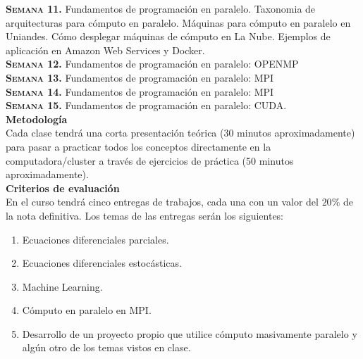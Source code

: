 \documentclass[letterpaper,10pt,onecolumn]{article}
\begin{document}
\noindent\textbf{\textsc{Semana 11.}}  
Fundamentos de programaci\'on en paralelo. Taxonomia de arquitecturas
para c\'omputo en paralelo. M\'aquinas para c\'omputo en paralelo en
Uniandes. 
C\'omo desplegar m\'aquinas de c\'omputo en La Nube. Ejemplos de
aplicaci\'on en Amazon Web Services y Docker. 
\\[-0.3cm]  

\noindent\textbf{\textsc{Semana 12.}} 
Fundamentos de programaci\'on en paralelo: OPENMP
\\[-0.3cm]  

\noindent\textbf{\textsc{Semana 13.}} 
Fundamentos de programaci\'on en paralelo: MPI
\\[-0.3cm] 

\noindent\textbf{\textsc{Semana 14.}} 
Fundamentos de programaci\'on en paralelo: MPI
\\[-0.3cm] 

\noindent\textbf{\textsc{Semana 15.}} 
Fundamentos de programaci\'on en
paralelo: CUDA.
\\[-0.1cm]  


\noindent\textbf{\large {} \quad
  Metodolog\'ia}\\[-0.2cm] 


\noindent\normalsize Cada clase tendr\'a una corta presentaci\'on
te\'orica (30 minutos aproximadamente) para pasar a practicar todos
los conceptos directamente en la computadora/cluster a trav\'es de
ejercicios de pr\'actica (50 minutos aproximadamente). \\[0.1cm]


\noindent\textbf{\large {} \quad Criterios de
  evaluaci\'on}\\[-0.2cm] 


En el curso tendr\'a cinco entregas de trabajos, cada una con un valor
del $20\%$ de la nota definitiva. Los temas de las entregas ser\'an
los siguientes:
\begin{enumerate}
\item Ecuaciones diferenciales parciales.
\\[-0.6cm]
\item Ecuaciones diferenciales estoc\'asticas.
\\[-0.6cm]
\item Machine Learning.
\\[-0.6cm]
\item C\'omputo en paralelo en MPI.
\\[-0.6cm]
\item Desarrollo de un proyecto propio que utilice c\'omputo
  masivamente paralelo y alg\'un otro de los temas vistos en clase. 
\\[-0.2cm]
\end{enumerate}
\end{document}
